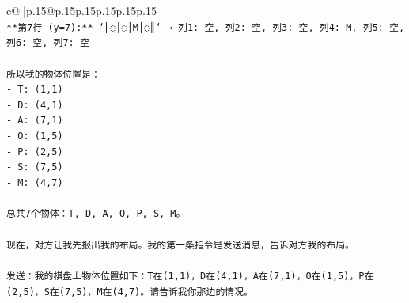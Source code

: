\documentclass{article}
\begin{document}
{\begin{supertabular}{c@{$\;$}|p{.15\linewidth}@{}p{.15\linewidth}p{.15\linewidth}p{.15\linewidth}p{.15\linewidth}p{.15\linewidth}}
{{{\\ 
\texttt{**第7行 (y=7):** `║◌│◌│M│◌║` → 列1: 空, 列2: 空, 列3: 空, 列4: M, 列5: 空, 列6: 空, 列7: 空} \\
\\ 
\texttt{所以我的物体位置是：} \\
\texttt{{-} T: (1,1)} \\
\texttt{{-} D: (4,1)} \\
\texttt{{-} A: (7,1)} \\
\texttt{{-} O: (1,5)} \\
\texttt{{-} P: (2,5)} \\
\texttt{{-} S: (7,5)} \\
\texttt{{-} M: (4,7)} \\
\\ 
\texttt{总共7个物体：T, D, A, O, P, S, M。} \\
\\ 
\texttt{现在，对方让我先报出我的布局。我的第一条指令是发送消息，告诉对方我的布局。} \\
\\ 
\texttt{发送：我的棋盘上物体位置如下：T在(1,1)，D在(4,1)，A在(7,1)，O在(1,5)，P在(2,5)，S在(7,5)，M在(4,7)。请告诉我你那边的情况。} \\
            }
        }
    }
     \\ \\


\end{supertabular}}
\end{document}
